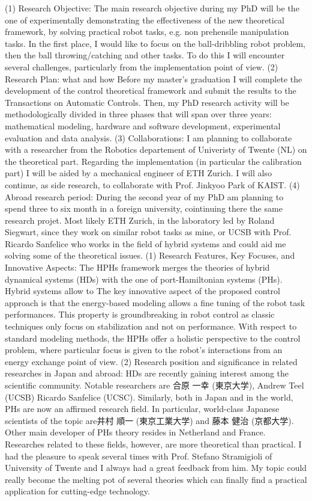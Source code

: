 (1) Research Objective: 
The main research objective during my PhD will be the one of experimentally demonstrating the effectiveness of the new theoretical framework, by solving practical robot tasks, e.g. non prehensile manipulation tasks. In the first place, I would like to focus on the ball-dribbling robot problem, then the ball throwing/catching and other tasks. To do this I will encounter several challenges, particularly from the implementation point of view.
(2) Research Plan: what and how 
Before my master’s graduation I will complete the development of the control theoretical framework and submit the results to the Transactions on Automatic Controls. Then, my PhD research activity will be methodologically divided in three phases that will span over three years: mathematical modeling, hardware and software development, experimental evaluation and data analysis.
(3) Collaborations: 
I am planning to collaborate with a researcher from the Robotics departement of Univeristy of Twente (NL) on the theoretical part. Regarding the implementation (in particular the calibration part) I will be aided by a mechanical engineer of ETH Zurich. I will also continue, as side research, to collaborate with Prof. Jinkyoo Park of KAIST.
(4) Abroad research period: 
During the second year of my PhD am planning to spend three to six month in a foreign university, cointinuing there the same research projet. Most likely ETH Zurich, in the laboratory led by Roland Siegwart, since they work on similar robot tasks as mine, or UCSB with Prof. Ricardo Sanfelice who works in the field of hybrid systems and could aid me solving some of the theoretical issues.
(1) Research Features, Key Focuses, and Innovative Aspects: The HPHs framework merges the theories of hybrid dynamical systems (HDs) with the one of port-Hamiltonian systems (PHs). Hybrid systems allow to The key innovative aspect of the proposed control approach is that the energy-based modeling allows a fine tuning of the robot task performances. This property is groundbreaking in robot control as classic techniques only focus on stabilization and not on performance. With respect to standard modeling methods, the HPHs offer a holistic perspective to the control problem, where particular focus is given to the robot’s interactions from an energy exchange point of view. 
(2) Research position and significance in related researches in Japan and abroad: HDs are recently gaining interest among the scientific community. Notable researchers are 合原 一幸 (東京大学), Andrew Teel (UCSB) Ricardo Sanfelice (UCSC). Similarly, both in Japan and in the world, PHs are now an affirmed research field. In particular, world-class Japanese scientists of the topic are井村 順一 (東京工業大学) and 藤本 健治 (京都大学). Other main developer of PHs theory resides in Netherland and France. Researches related to these fields, however, are more theoretical than practical. I had the pleasure to speak several times with Prof. Stefano Stramigioli of University of Twente and I always had a great feedback from him. My topic could really become the melting pot of several theories which can finally find a practical application for cutting-edge technology.
